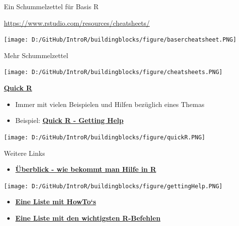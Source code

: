 \documentclass[ignorenonframetext,]{beamer}
\providecommand{\tightlist}{%
  \setlength{\itemsep}{0pt}\setlength{\parskip}{0pt}}
\begin{document}
\begin{frame}{Ein Schummelzettel für Basis R}
\protect\hypertarget{ein-schummelzettel-fur-basis-r}{}

\url{https://www.rstudio.com/resources/cheatsheets/}

\texttt{[image: D:/GitHub/IntroR/buildingblocks/figure/basercheatsheet.PNG]}

\end{frame}

\begin{frame}{Mehr Schummelzettel}
\protect\hypertarget{mehr-schummelzettel}{}

\texttt{[image: D:/GitHub/IntroR/buildingblocks/figure/cheatsheets.PNG]}

\end{frame}

\begin{frame}{\href{http://www.statmethods.net/interface/help.html}{\textbf{Quick
R}}}
\protect\hypertarget{quick-r}{}

\begin{itemize}
\tightlist
\item
  Immer mit vielen Beispielen und Hilfen bezüglich eines Themas
\item
  Beispiel:
  \href{http://www.statmethods.net/interface/help.html}{\textbf{Quick R
  - Getting Help}}
\end{itemize}

\texttt{[image: D:/GitHub/IntroR/buildingblocks/figure/quickR.PNG]}

\end{frame}

\begin{frame}{Weitere Links}
\protect\hypertarget{weitere-links}{}

\begin{itemize}
\tightlist
\item
  \href{https://www.r-project.org/help.html}{\textbf{Überblick - wie
  bekommt man Hilfe in R}}
\end{itemize}

\texttt{[image: D:/GitHub/IntroR/buildingblocks/figure/gettingHelp.PNG]}

\begin{itemize}
\item
  \href{http://rprogramming.net/}{\textbf{Eine Liste mit HowTo`s}}
\item
  \href{https://www.personality-project.org/r/r.commands.html}{\textbf{Eine
  Liste mit den wichtigsten R-Befehlen}}
\end{itemize}

\end{frame}
\end{document}
